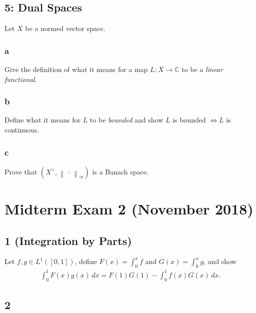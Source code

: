 \hypertarget{dual-spaces}{%
\subsection{5: Dual Spaces}\label{dual-spaces}}

Let \(X\) be a normed vector space.

\hypertarget{a-4}{%
\subsubsection{a}\label{a-4}}

Give the definition of what it means for a map \(L:X\to {\mathbb{C}}\)
to be a \emph{linear functional}.

\hypertarget{b-4}{%
\subsubsection{b}\label{b-4}}

Define what it means for \(L\) to be \emph{bounded} and show \(L\) is
bounded \(\iff L\) is continuous.

\hypertarget{c-3}{%
\subsubsection{c}\label{c-3}}

Prove that
\((X^\vee, {\left\lVert {{\,\cdot\,}} \right\rVert}_{^{\operatorname{op}}})\)
is a Banach space.

\hypertarget{midterm-exam-2-november-2018}{%
\section{Midterm Exam 2 (November
2018)}\label{midterm-exam-2-november-2018}}

\hypertarget{integration-by-parts}{%
\subsection{1 (Integration by Parts)}\label{integration-by-parts}}

Let \(f, g\in L^1([0, 1])\), define \(F(x) = \int_0^x f\) and
\(G(x) = \int_0^x g\), and show
\begin{align*} \int_0^1 F(x)g(x) \,dx = F(1)G(1) - \int_0^1 f(x) G(x) \, dx .\end{align*}

\hypertarget{section}{%
\subsection{2}\label{section}}

